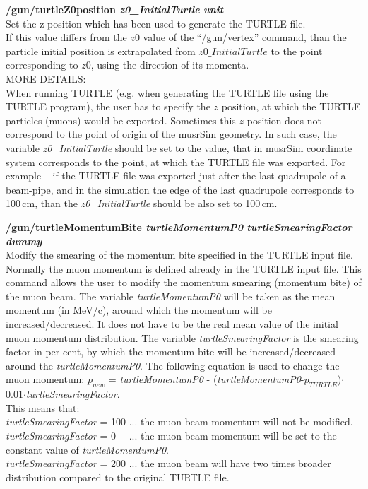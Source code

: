 \documentclass[twoside]{dis04}
\begin{document}
\begin{description}
\item{\bf /gun/turtleZ0position  \emph{z0\_InitialTurtle}  \emph{unit}}\\
	Set the z-position which has been used to generate the TURTLE file.\\
	If this value differs from the $z0$ value of the ``/gun/vertex'' command,
	than the particle initial position is extrapolated from $z0\_InitialTurtle$ 
	to the point corresponding to $z0$, using the direction of its momenta.\\
	MORE DETAILS:\\
	When running TURTLE (e.g. when generating the TURTLE file using the TURTLE program),
	the user has to specify the $z$ position, at which the TURTLE particles (muons) would be exported.
	Sometimes this $z$ position does not correspond to the point of origin of the musrSim
	geometry.  In such case, the variable \emph{z0\_InitialTurtle} should be set to the
	value, that in musrSim coordinate system corresponds to the point, at which the TURTLE
	file was exported.  For example -- if the TURTLE file was exported just after the last
	quadrupole of a beam-pipe, and in the simulation the edge of the last quadrupole corresponds
	to 100\,cm, than the \emph{z0\_InitialTurtle} should be also set to 100\,cm.\\
	
\item{\bf /gun/turtleMomentumBite \emph{turtleMomentumP0} \emph{turtleSmearingFactor} \emph{dummy} }\\
	Modify the smearing of the momentum bite specified in the TURTLE input file.  
	Normally the muon momentum is defined already in the TURTLE input file.  This command allows the user
	to modify the momentum smearing (momentum bite) of the muon beam.
	The variable \emph{turtleMomentumP0} will be taken as the mean momentum (in MeV/c), around which
	the momentum will be increased/decreased. It does not have to be the real mean value of the initial muon momentum distribution.
        The variable \emph{turtleSmearingFactor} is the smearing factor in per cent, by which the momentum bite
	will be increased/decreased around the \emph{turtleMomentumP0}.  The following equation is used to change the
	muon momentum: $p_{new}$ = {\it turtleMomentumP0} - ({\it turtleMomentumP0}-$p_{TURTLE}$)$\cdot$0.01$\cdot${\it turtleSmearingFactor}.\\
	This means that:\\
	{\it turtleSmearingFactor} = 100 ... the muon beam momentum will not be modified.\\
	{\it turtleSmearingFactor} = 0 ~~... the muon beam momentum will be set to the constant value of {\it turtleMomentumP0}.\\
	{\it turtleSmearingFactor} = 200 ... the muon beam will have two times broader distribution compared to the original TURTLE file.


\end{description}
\end{document}
